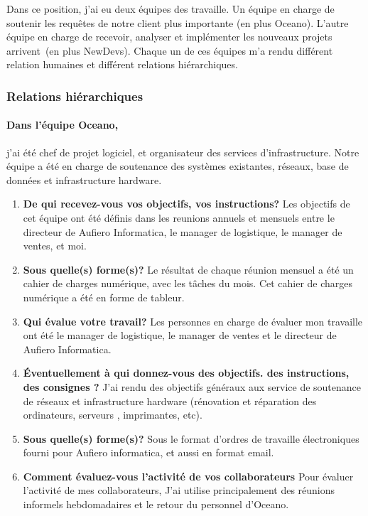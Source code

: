 \documentclass{resume} %
\begin{document}
Dans ce position, j'ai eu deux équipes des travaille. Un équipe en charge de soutenir les requêtes de notre client plus importante (en plus Oceano). L'autre équipe en charge de recevoir, analyser et implémenter les nouveaux projets arrivent~(en plus NewDevs). 
Chaque un de ces équipes m'a rendu différent relation humaines et différent relations hiérarchiques.  
	
	
	\subsubsection{Relations hiérarchiques} 
	

		\paragraph{Dans l'équipe Oceano,} j'ai été chef de projet logiciel, et organisateur des services d'infrastructure.  Notre équipe a été en charge de soutenance des systèmes existantes, réseaux, base de données et infrastructure hardware. 
		
		\begin{enumerate}
		\item \textbf{De qui recevez-vous vos objectifs, vos instructions?}
			Les objectifs de cet équipe ont été définis dans les reunions annuels et mensuels entre le directeur de Aufiero Informatica, le manager de logistique, le manager de ventes, et moi.
		\item \textbf{Sous quelle(s) forme(s)?}
			Le résultat de chaque réunion mensuel a été un cahier de charges numérique, avec les tâches du mois. Cet cahier de charges numérique  a été en forme de tableur.
		\item \textbf{Qui évalue votre travail?}
			Les personnes en charge de évaluer mon travaille ont été  le manager de logistique, le manager de ventes et le directeur de Aufiero Informatica. 
		\item  \textbf{Éventuellement à qui donnez-vous des objectifs. des instructions, des consignes ?}
			J'ai rendu des objectifs généraux aux service de soutenance de réseaux et infrastructure hardware (rénovation et réparation des ordinateurs, serveurs , imprimantes, etc).
		\item \textbf{Sous quelle(s) forme(s)?}
			Sous le format d'ordres de travaille électroniques fourni pour Aufiero informatica, et aussi en format email. 
		\item \textbf{Comment évaluez-vous l'activité de vos collaborateurs}
			Pour évaluer l'activité de mes collaborateurs, J'ai utilise principalement des réunions informels hebdomadaires et le retour du personnel d'Oceano. 
		\end{enumerate}
		
\end{document}
